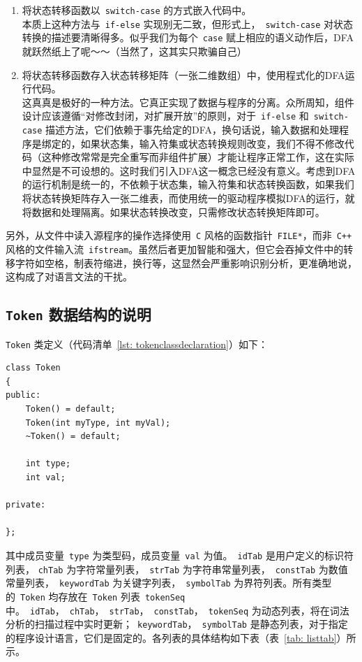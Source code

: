 \documentclass{article}
\begin{document}
\begin{CJK*}{UTF8}{gbsn}
\begin{enumerate}
\item 将状态转移函数以~\texttt{switch-case} 的方式嵌入代码中。 \\
本质上这种方法与~\texttt{if-else} 实现别无二致，但形式上，~\texttt{switch-case} 对状态转换的描述要清晰得多。似乎我们为每个~\texttt{case} 赋上相应的语义动作后，DFA就跃然纸上了呢～～（当然了，这其实只欺骗自己）

\item 将状态转移函数存入状态转移矩阵（一张二维数组）中，使用程式化的DFA运行代码。 \\
这真真是极好的一种方法。它真正实现了数据与程序的分离。众所周知，组件设计应该遵循“对修改封闭，对扩展开放”的原则，对于~\texttt{if-else} 和~\texttt{switch-case} 描述方法，它们依赖于事先给定的DFA，换句话说，输入数据和处理程序是绑定的，如果状态集，输入符集或状态转换规则改变，我们不得不修改代码（这种修改常常是完全重写而非组件扩展）才能让程序正常工作，这在实际中显然是不可设想的。这时我们引入DFA这一概念已经没有意义。考虑到DFA的运行机制是统一的，不依赖于状态集，输入符集和状态转换函数，如果我们将状态转换矩阵存入一张二维表，而使用统一的驱动程序模拟DFA的运行，就将数据和处理隔离。如果状态转换改变，只需修改状态转换矩阵即可。
\end{enumerate}

另外，从文件中读入源程序的操作选择使用~\texttt{C} 风格的函数指针~\texttt{FILE*}，而非~\texttt{C++} 风格的文件输入流~\texttt{ifstream}。虽然后者更加智能和强大，但它会吞掉文件中的转移字符如空格，制表符缩进，换行等，这显然会严重影响识别分析，更准确地说，这构成了对语言文法的干扰。

\subsection{\texttt{Token} 数据结构的说明}
\texttt{Token} 类定义（代码清单~\ref{lst: tokenclassdeclaration}）如下：
\begin{center}
\begin{lstlisting}[caption = {\texttt{Token} 类定义代码清单}, label = {lst: tokenclassdeclaration}]
class Token
{
public:
	Token() = default;
	Token(int myType, int myVal);
	~Token() = default;

	int type;
	int val;

private:

};
\end{lstlisting}
\end{center}

其中成员变量~\texttt{type} 为类型码，成员变量~\texttt{val} 为值。~\texttt{idTab} 是用户定义的标识符列表， \texttt{chTab} 为字符常量列表，~\texttt{strTab} 为字符串常量列表，~\texttt{constTab} 为数值常量列表，~\texttt{keywordTab} 为关键字列表，~\texttt{symbolTab} 为界符列表。所有类型的~\texttt{Token} 均存放在~\texttt{Token} 列表~\texttt{tokenSeq} 中。~\texttt{idTab}，~\texttt{chTab}，~\texttt{strTab}，~\texttt{constTab}，~\texttt{tokenSeq} 为动态列表，将在词法分析的扫描过程中实时更新；~\texttt{keywordTab}，~\texttt{symbolTab} 是静态列表，对于指定的程序设计语言，它们是固定的。各列表的具体结构如下表（表~\ref{tab: listtab}）所示。


\end{CJK*}
\end{document}
